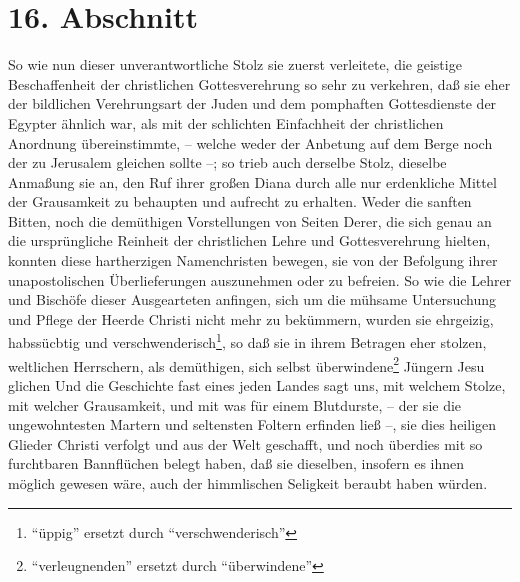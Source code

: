 \section{16. Abschnitt} \label{kap7_ab16}

So wie nun dieser unverantwortliche Stolz sie zuerst verleitete, die geistige
Beschaffenheit der christlichen Gottesverehrung so sehr zu verkehren, daß sie
eher der bildlichen Verehrungsart der Juden und dem pomphaften Gottesdienste
der Egypter ähnlich war, als mit der schlichten Einfachheit der christlichen
Anordnung übereinstimmte, -- welche weder der Anbetung auf dem Berge noch der zu
Jerusalem gleichen sollte --; so trieb auch derselbe Stolz, dieselbe
Anmaßung sie an, den Ruf ihrer großen Diana durch alle nur erdenkliche
Mittel der Grausamkeit zu behaupten und aufrecht zu erhalten. Weder die sanften
Bitten, noch die demüthigen Vorstellungen von Seiten Derer, die sich genau an
die ursprüngliche Reinheit der christlichen Lehre und Gottesverehrung hielten,
konnten diese hartherzigen Namenchristen bewegen, sie von der Befolgung ihrer
unapostolischen Überlieferungen auszunehmen oder zu befreien. So wie die Lehrer
und Bischöfe dieser Ausgearteten anfingen, sich um die mühsame Untersuchung und
Pflege der Heerde Christi nicht mehr zu bekümmern, wurden sie ehrgeizig,
habssücbtig und verschwenderisch\footnote{"`üppig"' ersetzt durch "`verschwenderisch"'}, so daß sie in ihrem Betragen eher stolzen, weltlichen
Herrschern, als demüthigen, sich selbst überwindene\footnote{"`verleugnenden"' ersetzt durch "`überwindene"'} Jüngern Jesu glichen
Und die Geschichte fast eines jeden Landes sagt uns, mit welchem Stolze, mit
welcher Grausamkeit, und mit was für einem Blutdurste, -- der sie die
ungewohntesten Martern und seltensten Foltern erfinden ließ --, sie dies
heiligen Glieder Christi verfolgt und aus der Welt geschafft, und noch
überdies mit so furchtbaren Bannflüchen belegt haben, daß sie dieselben,
insofern es ihnen möglich gewesen wäre, auch der himmlischen Seligkeit beraubt
haben würden.

\medskip

